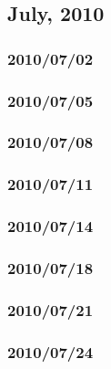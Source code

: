 \documentclass{article}
\begin{document}
\subsection{July, 2010}

\subsubsection{2010/07/02}

\subsubsection{2010/07/05}

\subsubsection{2010/07/08}
\subsubsection{2010/07/11}
\subsubsection{2010/07/14}
\subsubsection{2010/07/18}
\subsubsection{2010/07/21}
\subsubsection{2010/07/24}
\end{document}

